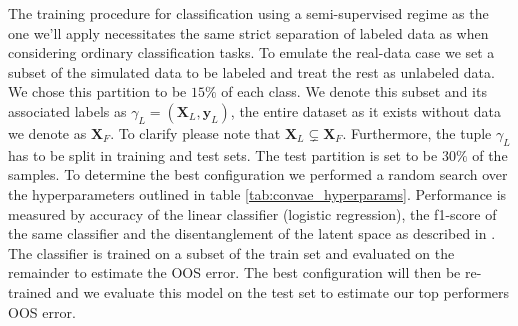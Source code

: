 The training procedure for classification using a semi-supervised regime as the one we'll apply necessitates the same strict separation of labeled data as when considering ordinary classification tasks. To emulate the real-data case we set a subset of the simulated data to be labeled and treat the rest as unlabeled data. We chose this partition to be $15\%$ of each class. We denote this subset and its associated labels as $\gamma_L=(\mathbf{X}_L, \mathbf{y}_L)$, the entire dataset as it exists without data we denote as $\mathbf{X}_F$. To clarify please note that $\mathbf{X}_L \subsetneq \mathbf{X}_F$. Furthermore, the tuple $\gamma_L$ has to be split in training and test sets. The test partition is set to be $30\%$ of the samples. To determine the best configuration we performed a random search over the hyperparameters outlined in table \ref{tab:convae_hyperparams}. Performance is measured by accuracy of the linear classifier (logistic regression), the f1-score of the same classifier and the disentanglement of the latent space as described in \citet{Zhao}. The classifier is trained on a subset of the train set and evaluated on the remainder to estimate the OOS error. The best configuration will then be re-trained and we evaluate this model on the test set to estimate our top performers OOS error.


